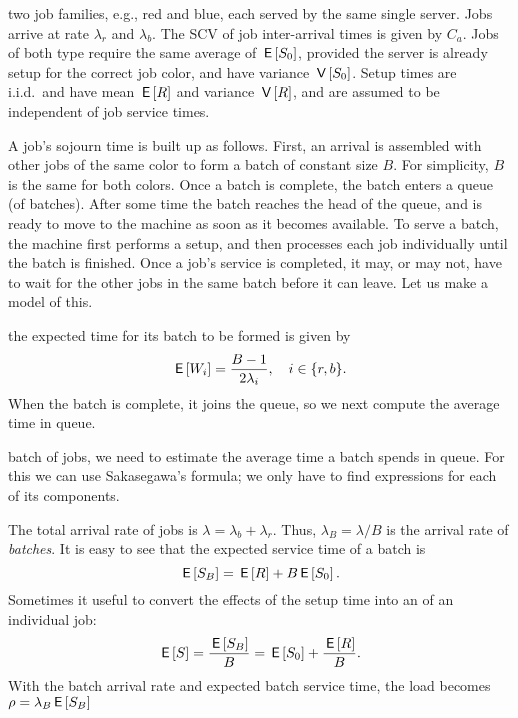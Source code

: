  two job families, e.g., red and blue, each served by the same single server.
Jobs arrive at rate $\lambda_r$ and $\lambda_b$. The SCV of job inter-arrival times is given by $C_a$. 
Jobs of both type require the same average  of $\,\mathsf{E}\left[S_0\right]$, provided the server is already setup for the correct job color, and have variance $\,\mathsf{V}\left[S_0\right]$.
Setup times are i.i.d.\ and  have mean $\,\mathsf{E}\left[R\right]$ and  variance $\,\mathsf{V}\left[R\right]$, and are assumed to be independent of job service times. 


A job's sojourn time is built up as follows.
First, an arrival is assembled with other jobs of the same color to form a batch of constant size $B$.
For simplicity, $B$ is the same for both colors.
Once a batch is complete, the batch enters a queue (of batches).
After some time the batch reaches the head of the queue, and is ready to move to the machine as soon as it becomes available.
To serve a batch, the machine first performs a setup, and then processes each job individually until the batch is finished.
Once a job's service is completed, it may, or may not, have to wait for the other jobs in the same batch before it can leave. 
Let us make a model of this. 


 the expected time for its batch to be formed is given by
\begin{equation}\label{eq:79}
 \,\mathsf{E}\left[W_i\right] = \frac{B-1}{2\lambda_i}, \quad i\in \{r, b\}. 
\end{equation}
When the batch is complete, it joins the queue, so we next compute the average time in queue.

 batch of jobs, we need to estimate the average time a batch spends in queue.
For this we can use Sakasegawa's formula;  we only have to find expressions for each of its components. 

The total arrival rate of jobs is $\lambda= \lambda_b+\lambda_r$. Thus, $\lambda_B=\lambda/B$ is the arrival rate of \emph{batches}. 
It is easy to see that the expected service time of a batch is 
\begin{equation}\label{eq:90}
\,\mathsf{E}\left[S_B\right] = \,\mathsf{E}\left[R\right] + B\,\mathsf{E}\left[S_0\right].
\end{equation}
Sometimes it useful to convert the effects of the  setup time into an  of an individual job:
\begin{equation}\label{eq:60}
  \,\mathsf{E}\left[S\right] = \frac{\,\mathsf{E}\left[S_B\right]}{B} = \,\mathsf{E}\left[S_0\right] + \frac{\,\mathsf{E}\left[R\right]} B.
 \end{equation}
With the batch arrival rate and expected batch service time, the load becomes  $\rho = \lambda_B \,\mathsf{E}\left[S_B\right]$

